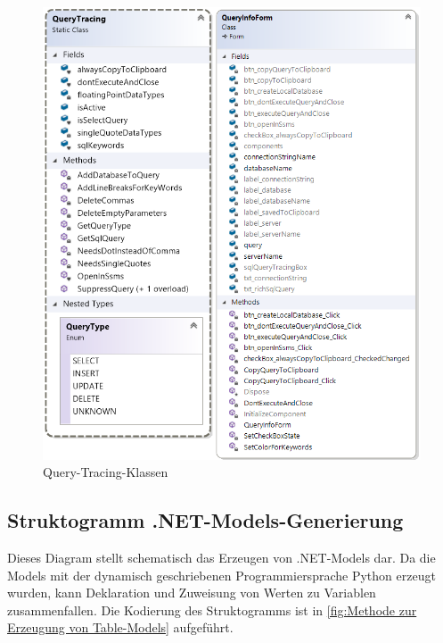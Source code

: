 \documentclass[11pt,toc=sectionentrywithoutdots, 
headheight=44pt, headings=optiontoheadandtoc, hyperfootnotes=false, hypertexnames=false]{scrartcl}
\begin{document}
 \begin{figure}[htp]
 \centering

	\includegraphics[scale=0.8]{queryTracingClass.png}
	 \caption{Query-Tracing-Klassen}
 \end{figure}
 \clearpage
 

\subsection{Struktogramm .NET-Models-Generierung}
Dieses Diagram stellt schematisch das Erzeugen von .NET-Models dar. Da die Models mit der dynamisch geschriebenen Programmiersprache Python erzeugt wurden, kann Deklaration und Zuweisung von Werten zu Variablen zusammenfallen. Die Kodierung des Struktogramms ist in \ref{fig:Methode zur Erzeugung von Table-Models} aufgeführt.
 \label{fig:Struktogramm .NET-Models erzeugen}
\end{document}
